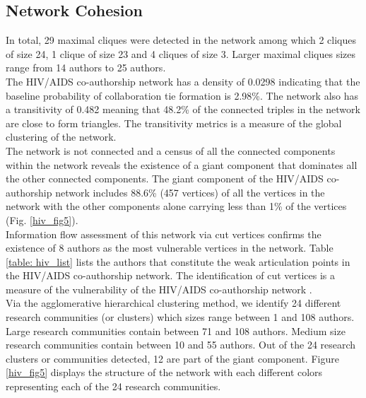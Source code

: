 \subsection{Network Cohesion}
In total, 29 maximal cliques were detected in the network among which 2 cliques of size 24, 1 clique of size 23 and 4 cliques of size 3. Larger maximal cliques sizes range from 14 authors to 25 authors. \\The HIV/AIDS co-authorship network has a density of 0.0298 indicating that the baseline probability of collaboration tie formation is 2.98\%. The network also has a transitivity of 0.482 meaning that 48.2\% of the connected triples in the network are close to form triangles. The transitivity metrics is a measure of the global clustering of the network.\\The network is not connected and a census of all the connected components within the network reveals the existence of a giant component that dominates all the other connected components. The giant component of the HIV/AIDS co-authorship network includes 88.6\% (457 vertices) of all the vertices in the network with the other components alone carrying less than 1\% of the vertices (Fig. \ref{hiv_fig5}). \\
Information flow assessment of this network via cut vertices confirms the existence of 8 authors as the most vulnerable vertices in the network. Table \ref{table: hiv_list} lists the authors that constitute the weak articulation points in the HIV/AIDS co-authorship network. The identification of cut vertices is a measure of the vulnerability of the HIV/AIDS co-authorship network \cite{kolaczyk_statistical_2014}.\\
Via the agglomerative hierarchical clustering method, we identify 24 different research communities (or clusters) which sizes range between 1 and 108 authors. Large research communities contain between 71 and 108 authors. Medium size research communities contain between 10 and 55 authors. Out of the 24 research clusters or communities detected, 12 are part of the giant component. Figure \ref{hiv_fig5} displays the structure of the network with each different colors representing each of the 24 research communities.

